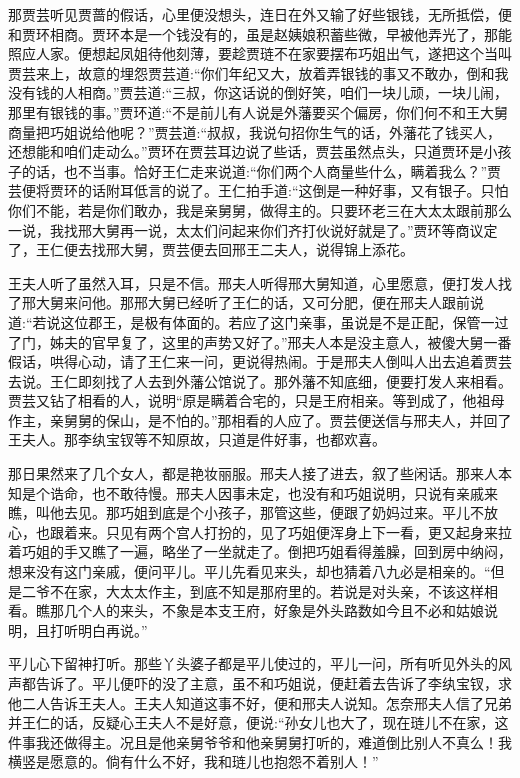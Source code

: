 \begin{parag}
    那贾芸听见贾蔷的假话，心里便没想头，连日在外又输了好些银钱，无所抵偿，便和贾环相商。贾环本是一个钱没有的，虽是赵姨娘积蓄些微，早被他弄光了，那能照应人家。便想起凤姐待他刻薄，要趁贾琏不在家要摆布巧姐出气，遂把这个当叫贾芸来上，故意的埋怨贾芸道:“你们年纪又大，放着弄银钱的事又不敢办，倒和我没有钱的人相商。”贾芸道:“三叔，你这话说的倒好笑，咱们一块儿顽，一块儿闹，那里有银钱的事。”贾环道:“不是前儿有人说是外藩要买个偏房，你们何不和王大舅商量把巧姐说给他呢？”贾芸道:“叔叔，我说句招你生气的话，外藩花了钱买人，还想能和咱们走动么。”贾环在贾芸耳边说了些话，贾芸虽然点头，只道贾环是小孩子的话，也不当事。恰好王仁走来说道:“你们两个人商量些什么，瞒着我么？”贾芸便将贾环的话附耳低言的说了。王仁拍手道:“这倒是一种好事，又有银子。只怕你们不能，若是你们敢办，我是亲舅舅，做得主的。只要环老三在大太太跟前那么一说，我找邢大舅再一说，太太们问起来你们齐打伙说好就是了。”贾环等商议定了，王仁便去找邢大舅，贾芸便去回邢王二夫人，说得锦上添花。
\end{parag}


\begin{parag}
    王夫人听了虽然入耳，只是不信。邢夫人听得邢大舅知道，心里愿意，便打发人找了邢大舅来问他。那邢大舅已经听了王仁的话，又可分肥，便在邢夫人跟前说道:“若说这位郡王，是极有体面的。若应了这门亲事，虽说是不是正配，保管一过了门，姊夫的官早复了，这里的声势又好了。”邢夫人本是没主意人，被傻大舅一番假话，哄得心动，请了王仁来一问，更说得热闹。于是邢夫人倒叫人出去追着贾芸去说。王仁即刻找了人去到外藩公馆说了。那外藩不知底细，便要打发人来相看。贾芸又钻了相看的人，说明“原是瞒着合宅的，只是王府相亲。等到成了，他祖母作主，亲舅舅的保山，是不怕的。”那相看的人应了。贾芸便送信与邢夫人，并回了王夫人。那李纨宝钗等不知原故，只道是件好事，也都欢喜。
\end{parag}


\begin{parag}
    那日果然来了几个女人，都是艳妆丽服。邢夫人接了进去，叙了些闲话。那来人本知是个诰命，也不敢待慢。邢夫人因事未定，也没有和巧姐说明，只说有亲戚来瞧，叫他去见。那巧姐到底是个小孩子，那管这些，便跟了奶妈过来。平儿不放心，也跟着来。只见有两个宫人打扮的，见了巧姐便浑身上下一看，更又起身来拉着巧姐的手又瞧了一遍，略坐了一坐就走了。倒把巧姐看得羞臊，回到房中纳闷，想来没有这门亲戚，便问平儿。平儿先看见来头，却也猜着八九必是相亲的。“但是二爷不在家，大太太作主，到底不知是那府里的。若说是对头亲，不该这样相看。瞧那几个人的来头，不象是本支王府，好象是外头路数如今且不必和姑娘说明，且打听明白再说。”
\end{parag}


\begin{parag}
    平儿心下留神打听。那些丫头婆子都是平儿使过的，平儿一问，所有听见外头的风声都告诉了。平儿便吓的没了主意，虽不和巧姐说，便赶着去告诉了李纨宝钗，求他二人告诉王夫人。王夫人知道这事不好，便和邢夫人说知。怎奈邢夫人信了兄弟并王仁的话，反疑心王夫人不是好意，便说:“孙女儿也大了，现在琏儿不在家，这件事我还做得主。况且是他亲舅爷爷和他亲舅舅打听的，难道倒比别人不真么！我横竖是愿意的。倘有什么不好，我和琏儿也抱怨不着别人！”
\end{parag}


